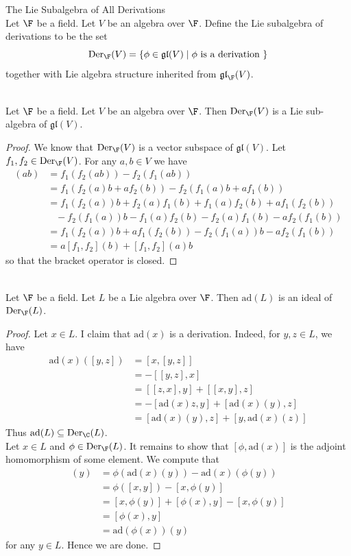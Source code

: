 \documentclass[a4paper]{article}
\begin{document}
\begin{defn}{The Lie Subalgebra of All Derivations}{} \\Let $\F$ be a field. Let $V$ be an algebra over $\F$. Define the Lie subalgebra of derivations to be the set $$\text{Der}_\F(V)=\{\phi\in\mathfrak{gl}(V)\;|\;\phi\text{ is a derivation }\}$$ together with Lie algebra structure inherited from $\mathfrak{gl}_\F(V)$. 
\end{defn}

\begin{lmm}{}{} \\Let $\F$ be a field. Let $V$ be an algebra over $\F$. Then $\text{Der}_\F(V)$ is a Lie sub-algebra of $\mathfrak{gl}(V)$. 
\begin{proof}
We know that $\text{Der}_\F(V)$ is a vector subspace of $\mathfrak{gl}(V)$. Let $f_1,f_2\in\text{Der}_\F(V)$. For any $a,b\in V$ we have 
\begin{align*}
[f_1,f_2](ab)&=f_1(f_2(ab))-f_2(f_1(ab))\\
&=f_1(f_2(a)b+af_2(b))-f_2(f_1(a)b+af_1(b))\\
&=f_1(f_2(a))b+f_2(a)f_1(b)+f_1(a)f_2(b)+af_1(f_2(b))\\
&\;\;\;-f_2(f_1(a))b-f_1(a)f_2(b)-f_2(a)f_1(b)-af_2(f_1(b))\\
&=f_1(f_2(a))b+af_1(f_2(b))-f_2(f_1(a))b-af_2(f_1(b))\\
&=a[f_1,f_2](b)+[f_1,f_2](a)b
\end{align*}
so that the bracket operator is closed. 
\end{proof}
\end{lmm}

\begin{lmm}{}{} \\Let $\F$ be a field. Let $L$ be a Lie algebra over $\F$. Then $\text{ad}(L)$ is an ideal of $\text{Der}_\F(L)$. 
\begin{proof}
Let $x\in L$. I claim that $\text{ad}(x)$ is a derivation. Indeed, for $y,z\in L$, we have 
\begin{align*}
\text{ad}(x)([y,z])&=[x,[y,z]]\\
&=-[[y,z],x]\\
&=[[z,x],y]+[[x,y],z]\\
&=-[\text{ad}(x)z,y]+[\text{ad}(x)(y),z]\\
&=[\text{ad}(x)(y),z]+[y,\text{ad}(x)(z)]
\end{align*}
Thus $\text{ad}(L)\subseteq\text{Der}_\C(L)$. \\

Let $x\in L$ and $\phi\in\text{Der}_\F(L)$. It remains to show that $[\phi,\text{ad}(x)]$ is the adjoint homomorphism of some element. We compute that 
\begin{align*}
[\phi,\text{ad}(x)](y)&=\phi(\text{ad}(x)(y))-\text{ad}(x)(\phi(y))\\
&=\phi([x,y])-[x,\phi(y)]\\
&=[x,\phi(y)]+[\phi(x),y]-[x,\phi(y)]\\
&=[\phi(x),y]\\
&=\text{ad}(\phi(x))(y)
\end{align*}
for any $y\in L$. Hence we are done. 
\end{proof}
\end{lmm}
\end{document}
